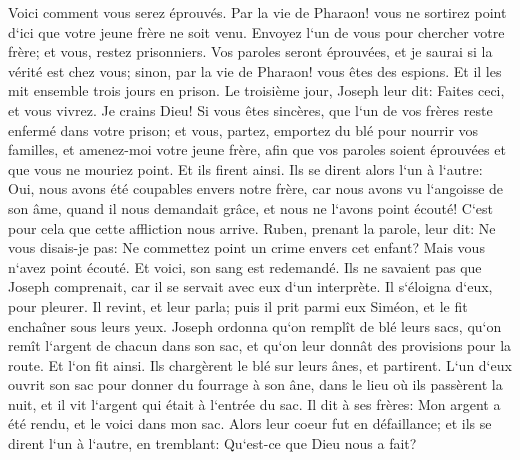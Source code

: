 \verse Voici comment vous serez éprouvés. Par la vie de Pharaon! vous ne sortirez point d`ici que votre jeune frère ne soit venu. 
\verse Envoyez l`un de vous pour chercher votre frère; et vous, restez prisonniers. Vos paroles seront éprouvées, et je saurai si la vérité est chez vous; sinon, par la vie de Pharaon! vous êtes des espions. 
\verse Et il les mit ensemble trois jours en prison. 
\verse Le troisième jour, Joseph leur dit: Faites ceci, et vous vivrez. Je crains Dieu! 
\verse Si vous êtes sincères, que l`un de vos frères reste enfermé dans votre prison; et vous, partez, emportez du blé pour nourrir vos familles, 
\verse et amenez-moi votre jeune frère, afin que vos paroles soient éprouvées et que vous ne mouriez point. Et ils firent ainsi. 
\verse Ils se dirent alors l`un à l`autre: Oui, nous avons été coupables envers notre frère, car nous avons vu l`angoisse de son âme, quand il nous demandait grâce, et nous ne l`avons point écouté! C`est pour cela que cette affliction nous arrive. 
\verse Ruben, prenant la parole, leur dit: Ne vous disais-je pas: Ne commettez point un crime envers cet enfant? Mais vous n`avez point écouté. Et voici, son sang est redemandé. 
\verse Ils ne savaient pas que Joseph comprenait, car il se servait avec eux d`un interprète. 
\verse Il s`éloigna d`eux, pour pleurer. Il revint, et leur parla; puis il prit parmi eux Siméon, et le fit enchaîner sous leurs yeux. 
\verse Joseph ordonna qu`on remplît de blé leurs sacs, qu`on remît l`argent de chacun dans son sac, et qu`on leur donnât des provisions pour la route. Et l`on fit ainsi. 
\verse Ils chargèrent le blé sur leurs ânes, et partirent. 
\verse L`un d`eux ouvrit son sac pour donner du fourrage à son âne, dans le lieu où ils passèrent la nuit, et il vit l`argent qui était à l`entrée du sac. 
\verse Il dit à ses frères: Mon argent a été rendu, et le voici dans mon sac. Alors leur coeur fut en défaillance; et ils se dirent l`un à l`autre, en tremblant: Qu`est-ce que Dieu nous a fait? 
